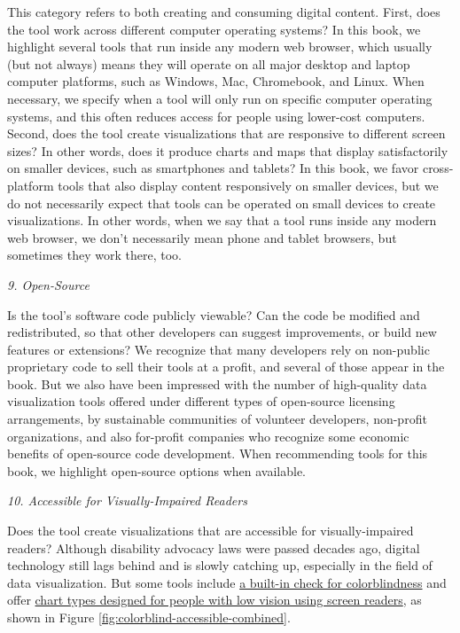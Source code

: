 \documentclass[
  english,
]{book}
\begin{document}
This category refers to both creating and consuming digital content. First, does the tool work across different computer operating systems? In this book, we highlight several tools that run inside any modern web browser, which usually (but not always) means they will operate on all major desktop and laptop computer platforms, such as Windows, Mac, Chromebook, and Linux. When necessary, we specify when a tool will only run on specific computer operating systems, and this often reduces access for people using lower-cost computers. Second, does the tool create visualizations that are responsive to different screen sizes? In other words, does it produce charts and maps that display satisfactorily on smaller devices, such as smartphones and tablets? In this book, we favor cross-platform tools that also display content responsively on smaller devices, but we do not necessarily expect that tools can be operated on small devices to create visualizations. In other words, when we say that a tool runs inside any modern web browser, we don't necessarily mean phone and tablet browsers, but sometimes they work there, too.

\emph{9. Open-Source}

Is the tool's software code publicly viewable? Can the code be modified and redistributed, so that other developers can suggest improvements, or build new features or extensions? We recognize that many developers rely on non-public proprietary code to sell their tools at a profit, and several of those appear in the book. But we also have been impressed with the number of high-quality data visualization tools offered under different types of open-source licensing arrangements, by sustainable communities of volunteer developers, non-profit organizations, and also for-profit companies who recognize some economic benefits of open-source code development. When recommending tools for this book, we highlight open-source options when available.

\emph{10. Accessible for Visually-Impaired Readers}

Does the tool create visualizations that are accessible for visually-impaired readers? Although disability advocacy laws were passed decades ago, digital technology still lags behind and is slowly catching up, especially in the field of data visualization. But some tools include \href{https://blog.datawrapper.de/colorblind-check/}{a built-in check for colorblindness} and offer \href{https://www.highcharts.com/demo/accessible-line}{chart types designed for people with low vision using screen readers}, as shown in Figure \ref{fig:colorblind-accessible-combined}.
\end{document}
